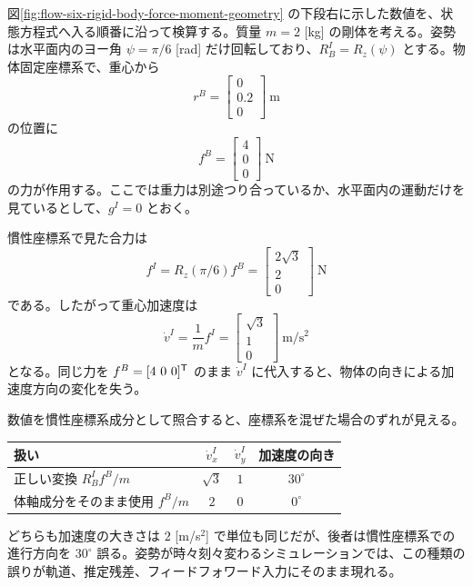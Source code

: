 \begin{example}[偏心した力を受ける剛体の瞬間加速度]
図\ref{fig:flow-six-rigid-body-force-moment-geometry} の下段右に示した数値を、状態方程式へ入る順番に沿って検算する。質量 $m=2$ [kg] の剛体を考える。姿勢は水平面内のヨー角 $\psi=\pi/6$ [rad] だけ回転しており、$R^I_B=R_z(\psi)$ とする。物体固定座標系で、重心から
\begin{equation}
  r^B=
  \begin{bmatrix}0\\0.2\\0\end{bmatrix}\ \mathrm{m}
\end{equation}
の位置に
\begin{equation}
  f^B=
  \begin{bmatrix}4\\0\\0\end{bmatrix}\ \mathrm{N}
\end{equation}
の力が作用する。ここでは重力は別途つり合っているか、水平面内の運動だけを見ているとして、$g^I=0$ とおく。

慣性座標系で見た合力は
\begin{equation}
  f^I=R_z(\pi/6)f^B
  =
  \begin{bmatrix}
    2\sqrt{3}\\2\\0
  \end{bmatrix}\ \mathrm{N}
\end{equation}
である。したがって重心加速度は
\begin{equation}
  \dot{v}^I=\frac{1}{m}f^I
  =
  \begin{bmatrix}
    \sqrt{3}\\1\\0
  \end{bmatrix}\ \mathrm{m/s^2}
\end{equation}
となる。同じ力を $f^B=[4\ 0\ 0]^{\mathsf{T}}$ のまま $\dot{v}^I$ に代入すると、物体の向きによる加速度方向の変化を失う。

数値を慣性座標系成分として照合すると、座標系を混ぜた場合のずれが見える。
\begin{center}
\begin{tabular}{lccc}
\hline
扱い & $\dot{v}_x^I$ & $\dot{v}_y^I$ & 加速度の向き\\
\hline
正しい変換 $R^I_B f^B/m$ & $\sqrt{3}$ & $1$ & $30^\circ$\\
体軸成分をそのまま使用 $f^B/m$ & $2$ & $0$ & $0^\circ$\\
\hline
\end{tabular}
\end{center}
どちらも加速度の大きさは $2$ [m/s$^2$] で単位も同じだが、後者は慣性座標系での進行方向を $30^\circ$ 誤る。姿勢が時々刻々変わるシミュレーションでは、この種類の誤りが軌道、推定残差、フィードフォワード入力にそのまま現れる。


\end{example}
